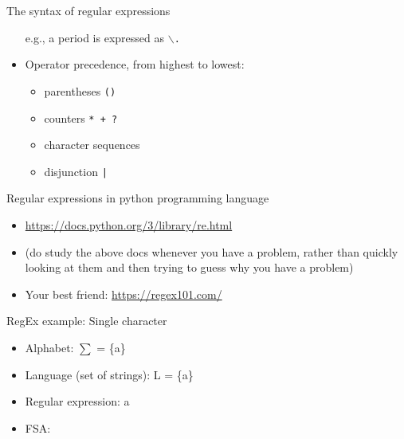 \documentclass{beamer}
\def\dx{1cm} \def\dy{1.5cm}
\newcommand{\newState}[4]{\node[state,#3](#1)[#4]{#2};}
\newcommand{\newTransition}[4]{\path[->] (#1) edge [#4] node {#3} (#2);}
\begin{document}
\begin{frame}[allowframebreaks]{The syntax of regular expressions}
\begin{itemize}
    e.g., a period is expressed as \texttt{$\backslash$.}

  \item Operator precedence, from highest to lowest:
    \begin{itemize}
    \item[] parentheses \texttt{()}
    \item[] counters \texttt{* + ?}
    \item[] character sequences
    \item[] disjunction \texttt{|}
    \end{itemize}
  \end{itemize}
\end{frame}


\begin{frame}{Regular expressions in python programming language}
  \begin{itemize}
  \item \url{https://docs.python.org/3/library/re.html} 
    
  \item (do study the above docs whenever you have a problem, rather
    than quickly looking at them and then trying to guess why you have a
    problem)
  \item Your best friend: \url{https://regex101.com/}
  \end{itemize}
\end{frame}


\begin{frame}[t]{RegEx example: Single character}
  \begin{itemize}
  \item Alphabet: $\sum$ = \{a\}
  \item Language (set of strings): L = \{a\}
  \item Regular expression: a
  \item FSA:
  \end{itemize}

  \pause

  \begin{center}
    \end{center}
\end{frame}
\end{document}
